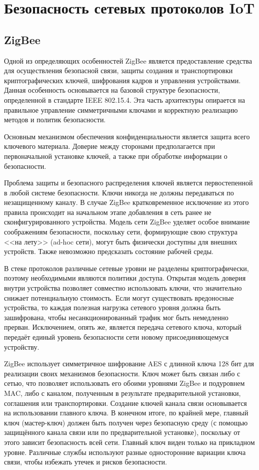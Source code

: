 \chapter{Безопасность сетевых протоколов IoT}

	\section{ZigBee}
	Одной из определяющих особенностей ZigBee является предоставление средства для осуществления 
	безопасной связи, защиты создания и транспортировки криптографических ключей, шифрования кадров 
	и управления устройствами. Данная особенность основывается на базовой структуре безопасности, определенной в 
	стандарте IEEE 802.15.4. Эта часть архитектуры опирается на правильное управление симметричными 
	ключами и корректную реализацию методов и политик безопасности.
	
	Основным механизмом обеспечения конфиденциальности является защита всего ключевого материала. 
	Доверие между сторонами предполагается при первоначальной установке ключей, а также при обработке 
	информации о безопасности.
	
	Проблема защиты и безопасного распределения ключей является первостепенной в любой системе
	безопасности. Ключи никогда не должны передаваться по незащищенному каналу. В случае ZigBee 
	кратковременное исключение из этого правила происходит на начальном этапе добавления в сеть 
	ранее не сконфигурированного устройства. Модель сети ZigBee уделяет особое внимание соображениям
	безопасности, поскольку сети, формирующие свою структура <<на лету>> (ad-hoc сети), могут быть 
	физически доступны для внешних устройств. Также невозможно предсказать состояние рабочей среды.
	
	В стеке протоколов различные сетевые уровни не разделены криптографически, поэтому необходимыми 
	являются политики доступа. Открытая модель доверия внутри устройства позволяет совместно использовать 
	ключи, что значительно снижает потенциальную стоимость. Если могут существовать вредоносные устройства, 
	то каждая полезная нагрузка сетевого уровня должна быть зашифрована, чтобы несанкционированный 
	трафик мог быть немедленно прерван. Исключением, опять же, является передача сетевого ключа, 
	который передаёт единый уровень безопасности сети новому присоединяющемуся устройству.
	
	ZigBee использует симметричное шифрование AES с длинной ключа 128 бит для реализации своих механизмов 
	безопасности. Ключ может быть связан либо с сетью, что позволяет использовать его обоими уровнями 
	ZigBee и подуровнем MAC, либо с каналом, полученным в результате предварительной установки, соглашения 
	или транспортировки. Создание ключей канала связи основывается на использовании главного ключа. 
	В конечном итоге, по крайней мере, главный ключ (мастер-ключ) должен быть получен через безопасную 
	среду (с помощью защищённого канала связи или по предварительной установке), поскольку от этого 
	зависит безопасность всей сети. Главный ключ виден только на прикладном уровне. Различные службы 
	используют разные односторонние вариации ключа связи, чтобы избежать утечек и рисков безопасности.
	

